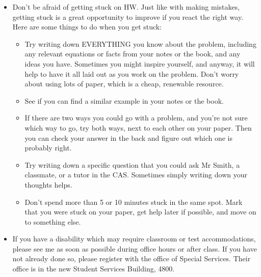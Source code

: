 \documentclass[12pt, twoside]{article}
\begin{document}
\begin{itemize}
   \item Don't be afraid of getting stuck on HW. Just like with making mistakes, getting stuck is a great opportunity to improve if you react the right way. Here are some things to do when you get stuck:
   \begin{itemize}
      \item Try writing down EVERYTHING you know about the problem, including any relevant equations or facts from your notes or the book, and any ideas you have. Sometimes you might inspire yourself, and anyway, it will help to have it all laid out as you work on the problem. Don't worry about using lots of paper, which is a cheap, renewable resource.
      \item See if you can find a similar example in your notes or the book. 
      \item If there are two ways you could go with a problem, and you're not sure which way to go, try both ways, next to each other on your paper. Then you can check your answer in the back and figure out which one is probably right.
      \item Try writing down a specific question that you could ask Mr Smith, a classmate, or a tutor in the CAS. Sometimes simply writing down your thoughts helps.
      \item Don't spend more than 5 or 10 minutes stuck in the same spot. Mark that you were stuck on your paper, get help later if possible, and move on to something else.
   \end{itemize}    
   
   \item If you have a disability which may require classroom or test accommodations, please see me as soon as possible during office hours or after class. If you have not already done so, please register with the office of Special Services. Their office is in the new Student Services Building, 4800.
\end{itemize}


\newpage
\end{document}
